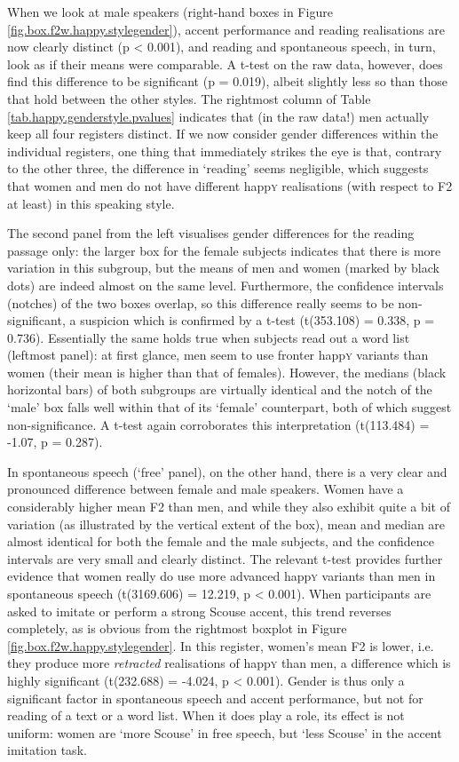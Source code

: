 When we look at male speakers (right-hand boxes in Figure \ref{fig.box.f2w.happy.stylegender}), accent performance and reading realisations are now clearly distinct (p < 0.001), and reading and spontaneous speech, in turn, look as if their means were comparable.
A t-test on the raw data, however, does find this difference to be significant (p = 0.019), albeit slightly less so than those that hold between the other styles.
The rightmost column of Table \ref{tab.happy.genderstyle.pvalues} indicates that (in the raw data!) men actually keep all four registers distinct.
If we now consider gender differences within the individual registers, one thing that immediately strikes the eye is that, contrary to the other three, the difference in `reading' seems negligible, which suggests that women and men do not have different happ\textsc{y} realisations (with respect to F2 at least) in this speaking style.

The second panel from the left visualises gender differences for the reading passage only: the larger box for the female subjects indicates that there is more variation in this subgroup, but the means of men and women (marked by black dots) are indeed almost on the same level.
Furthermore, the confidence intervals (notches) of the two boxes overlap, so this difference really seems to be non-significant, a suspicion which is confirmed by a t-test (t(353.108) = 0.338, p = 0.736).
Essentially the same holds true when subjects read out a word list (leftmost panel): at first glance, men seem to use fronter happ\textsc{y} variants than women (their mean is higher than that of females).
However, the medians (black horizontal bars) of both subgroups are virtually identical and the notch of the `male' box falls well within that of its `female' counterpart, both of which suggest non-significance.
A t-test again corroborates this interpretation (t(113.484) = -1.07, p = 0.287).

In spontaneous speech (`free' panel), on the other hand, there is a very clear and pronounced difference between female and male speakers.
Women have a considerably higher mean F2 than men, and while they also exhibit quite a bit of variation (as illustrated by the vertical extent of the box), mean and median are almost identical for both the female and the male subjects, and the confidence intervals are very small and clearly distinct.
The relevant t-test provides further evidence that women really do use more advanced happ\textsc{y} variants than men in spontaneous speech (t(3169.606) = 12.219, p < 0.001).
When participants are asked to imitate or perform a strong Scouse accent, this trend reverses completely, as is obvious from the rightmost boxplot in Figure \ref{fig.box.f2w.happy.stylegender}.
In this register, women's mean F2 is lower, i.e. they produce more \emph{retracted} realisations of happ\textsc{y} than men, a difference which is highly significant (t(232.688) = -4.024, p < 0.001).
Gender is thus only a significant factor in spontaneous speech and accent performance, but not for reading of a text or a word list.
When it does play a role, its effect is not uniform: women are `more Scouse' in free speech, but `less Scouse' in the accent imitation task.

